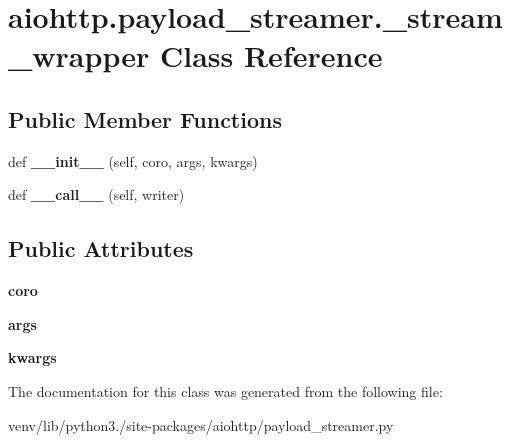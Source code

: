 \hypertarget{classaiohttp_1_1payload__streamer_1_1__stream__wrapper}{}\section{aiohttp.\+payload\+\_\+streamer.\+\_\+stream\+\_\+wrapper Class Reference}
\label{classaiohttp_1_1payload__streamer_1_1__stream__wrapper}
\subsection*{Public Member Functions}
\begin{DoxyCompactItemize}
\item 
\mbox{\label{classaiohttp_1_1payload__streamer_1_1__stream__wrapper_a9422af3de68d48e22842b496ee4130dd}} 
def {\bfseries \+\_\+\+\_\+init\+\_\+\+\_\+} (self, coro, args, kwargs)
\item 
\mbox{\label{classaiohttp_1_1payload__streamer_1_1__stream__wrapper_a161aa5d4b1532a532a36cb1a85d44bca}} 
def {\bfseries \+\_\+\+\_\+call\+\_\+\+\_\+} (self, writer)
\end{DoxyCompactItemize}
\subsection*{Public Attributes}
\begin{DoxyCompactItemize}
\item 
\mbox{\label{classaiohttp_1_1payload__streamer_1_1__stream__wrapper_a69298834059afe6d3dd44222c70b6e06}} 
{\bfseries coro}
\item 
\mbox{\label{classaiohttp_1_1payload__streamer_1_1__stream__wrapper_a167a1445439d9b0a35a0bec6f32052f4}} 
{\bfseries args}
\item 
\mbox{\label{classaiohttp_1_1payload__streamer_1_1__stream__wrapper_ac8b24749d690c1356a853637d1f7e7d3}} 
{\bfseries kwargs}
\end{DoxyCompactItemize}


The documentation for this class was generated from the following file\+:\begin{DoxyCompactItemize}
\item 
venv/lib/python3./site-\/packages/aiohttp/payload\+\_\+streamer.\+py\end{DoxyCompactItemize}
